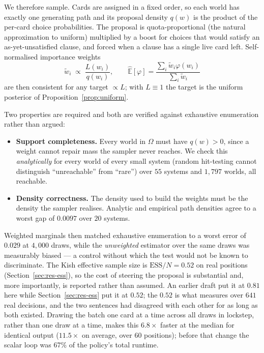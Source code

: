 \documentclass[11pt,letterpaper]{article}
\newcommand{\Ex}{\ensuremath{\mathbb{E}}}
\begin{document}
We therefore sample. Cards are assigned in a fixed order, so each world has
exactly one generating path and its proposal density $q(w)$ is the product of
the per-card choice probabilities. The proposal is quota-proportional (the
natural approximation to uniform) multiplied by a boost for choices that
would satisfy an as-yet-unsatisfied clause, and forced when a clause has a
single live card left. Self-normalised importance weights
\begin{equation}
\tilde{w}_i \;\propto\; \frac{L(w_i)}{q(w_i)},
\qquad
\widehat{\Ex}[\varphi] = \frac{\sum_i \tilde{w}_i \varphi(w_i)}{\sum_i \tilde{w}_i}
\label{eq:snis}
\end{equation}
are then consistent for any target $\propto L$; with $L \equiv 1$ the target is
the uniform posterior of Proposition~\ref{prop:uniform}.

Two properties are required and both are verified against exhaustive
enumeration rather than argued:

\begin{itemize}
\item \textbf{Support completeness.} Every world in $\Omega$ must have
$q(w) > 0$, since a weight cannot repair mass the sampler never reaches. We
check this \emph{analytically} for every world of every small system (random
hit-testing cannot distinguish ``unreachable'' from ``rare'') over $55$
systems and $1{,}797$ worlds, all reachable.
\item \textbf{Density correctness.} The density used to build the weights must
be the density the sampler realises. Analytic and empirical path densities
agree to a worst gap of $0.0097$ over $20$ systems.
\end{itemize}

Weighted marginals then matched exhaustive enumeration to a worst error of
$0.029$ at $4{,}000$ draws, while the \emph{unweighted} estimator over the same
draws was measurably biased --- a control without which the test would not be
known to discriminate. The Kish effective sample size is $\mathrm{ESS}/N = 0.52$
on real positions (Section~\ref{sec:res-ess}), so the cost of steering the
proposal is substantial and, more importantly, is reported rather than assumed.
An earlier draft put it at $0.81$ here while Section~\ref{sec:res-ess} put it at
$0.52$; the $0.52$ is what  measures over $641$
real decisions, and the two sentences had disagreed with each other for as long
as both existed. Drawing the batch one card at a
time across all draws in lockstep, rather than one draw at a time, makes this
$6.8\times$ faster at the median for identical output ($11.5\times$ on
average, over $60$ positions); before that change the scalar loop
was 67\% of the policy's total runtime.
\end{document}
